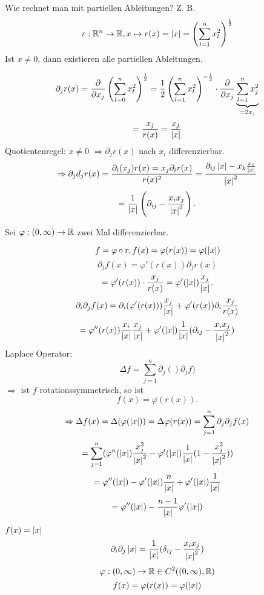 \documentclass[../ana2.tex]{subfiles}
\begin{document}
Wie rechnet man mit partiellen Ableitungen?
Z. B. \[ r:\mathbb{R}^n\rightarrow \mathbb{R}, x \mapsto r(x) = \left|x\right| 
= \left( \sum_{l=1}^n x_l^2 \right)^{\frac{1}{2}} \]
Ist \( x \neq 0 \), dann existieren alle partiellen Ableitungen.

\[ \partial_j r(x) = \frac{\partial}{\partial x_j} 
\left( \sum_{l=0}^n x_l^2 \right)^{\frac{1}{2}} 
= \frac{1}{2} \left( \sum_{l=1}^n x_l^2 \right)^{-\frac{1}{2}} 
\cdot \frac{\partial}{\partial x_j} \underbrace{\sum_{l=1}^n x_j^2}_{=2x_j} \]
\[ = \frac{x_j}{r(x)} = \frac{x_j}{\left|x\right|} \]
Quotientenregel: \( x \neq 0 \)
\( \Rightarrow \partial_j r(x) \) nach \( x_i \) 
differenzierbar.
\[ \Rightarrow \partial_j d_j r(x) 
= \frac{ \partial_i(x_j) r(x) = x_j \partial_i r(x) }{r(x)^2} 
= \frac{\partial_{ij} \left|x\right| - x_k \frac{x_i}{\left|x\right|}}{\left|x\right|^2} \]
\[ = \frac{1}{\left|x\right|} \left( \partial_{ij} - \frac{x_i x_j}{\left|x\right|^2} \right). \]

Sei \( \varphi:(0,\infty)\rightarrow \mathbb{R} \) zwei Mal differenzierbar. 

\[ f = \varphi \circ r, f(x) = \varphi(r(x)) = \varphi(\left|x\right|) \]
\[ \partial_j f(x) = \varphi'(r(x)) \partial_j r(x) \]
\[ = \varphi'(r(x)) \cdot \frac{x_j}{r(x)} 
= \varphi'(\left|x\right|) \frac{x_j}{\left|x\right|}. \]
\[ \partial_i \partial_j f(x) = \partial_i(\varphi'(r(x))) 
\frac{x_j}{\left|x\right|} + \varphi'(r(x)) \partial_i \frac{x_j}{r(x)} \]
\[ = \varphi''(r(x)) \frac{x_i}{\left|x\right|} \frac{x_j}{\left|x\right|} 
+ \varphi'(\left|x\right|) \frac{1}{\left|x\right|} (\partial_{ij} - \frac{x_i x_j}{\left|x\right|^2}) \]
Laplace Operator:
\[ \Delta f = \sum_{j=1}^n \partial_j ()\partial_j f) \]
\( \Rightarrow \) ist \(f\) rotationssymmetrisch, so ist 
\[ f(x) = \varphi(r(x)). \]
\[ \Rightarrow \Delta f(x) = \Delta(\varphi(\left|x\right|)) 
= \Delta \varphi(r(x)) = \sum_{j=1}^n 
\partial_j \partial_j f(x) \]
\[ = \sum_{j=1}^n (\varphi^n(\left|x\right|) \frac{x_j^2}{\left|x\right|^2} 
- \varphi'(\left|x\right|) \frac{1}{\left|x\right|} (1 - \frac{x_j^2}{\left|x\right|^2}) ) \]
\[ = \varphi''(\left|x\right|) - \varphi'(\left|x\right|) \frac{n}{\left|x\right|} 
+ \varphi'(\left|x\right|) \frac{1}{\left|x\right|} \]
\[ = \varphi''(\left|x\right|) - \frac{n-1}{\left|x\right|} \varphi'(\left|x\right|) \]

\( f(x) = \left|x\right| \)
\[ \partial_i \partial_j \left|x\right| 
= \frac{1}{\left|x\right|} (\delta_{ij} - \frac{x_i x_j}{\left|x\right|^2}) \]
\[ \varphi:(0,\infty)\rightarrow \mathbb{R} \in C^2((0,\infty), \mathbb{R}) \]
\[ f(x) = \varphi(r(x)) = \varphi(\left|x\right|) \]
\end{document}

